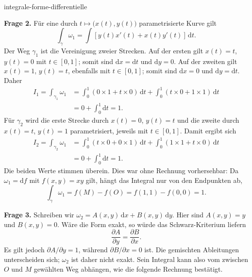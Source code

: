 \begin{exo}{integrale-forme-differentielle}
\begin{solution}
\textbf{Frage 2.} Für eine durch $t\mapsto\bigl(x(t),y(t)\bigr)$
parametrisierte Kurve gilt
\[
\int_\gamma\omega_1=\int\left[y(t)x'(t)+x(t)y'(t)\right]\,\mathrm{d}t.
\]
Der Weg $\gamma_1$ ist die Vereinigung zweier Strecken. Auf der ersten gilt
$x(t)=t$, $y(t)=0$ mit $t\in[0,1]$; somit sind $\mathrm{d}x=\mathrm{d}t$
und $\mathrm{d}y=0$. Auf der zweiten gilt $x(t)=1$, $y(t)=t$, ebenfalls mit
$t\in[0,1]$; somit sind $\mathrm{d}x=0$ und $\mathrm{d}y=\mathrm{d}t$. Daher
\[
\begin{aligned}
I_1=\int_{\gamma_1}\omega_1
&=\int_0^1\left(0\times1+t\times0\right)\,\mathrm{d}t
+\int_0^1\left(t\times0+1\times1\right)\,\mathrm{d}t\\
&=0+\int_0^1\mathrm{d}t=1.
\end{aligned}
\]
Für $\gamma_2$ wird die erste Strecke durch $x(t)=0$, $y(t)=t$ und die
zweite durch $x(t)=t$, $y(t)=1$ parametrisiert, jeweils mit $t\in[0,1]$.
Damit ergibt sich
\[
\begin{aligned}
I_2=\int_{\gamma_2}\omega_1
&=\int_0^1\left(t\times0+0\times1\right)\,\mathrm{d}t
+\int_0^1\left(1\times1+t\times0\right)\,\mathrm{d}t\\
&=0+\int_0^1\mathrm{d}t=1.
\end{aligned}
\]
Die beiden Werte stimmen überein. Dies war ohne Rechnung vorhersehbar: Da
$\omega_1=\mathrm{d}f$ mit $f(x,y)=xy$ gilt, hängt das Integral nur von den
Endpunkten ab,
\[
\int_\gamma\omega_1=f(M)-f(O)=f(1,1)-f(0,0)=1.
\]

\textbf{Frage 3.} Schreiben wir
$\omega_2=A(x,y)\,\mathrm{d}x+B(x,y)\,\mathrm{d}y$. Hier sind $A(x,y)=y$
und $B(x,y)=0$. Wäre die Form exakt, so würde das Schwarz-Kriterium liefern
\[
\frac{\partial A}{\partial y}=\frac{\partial B}{\partial x}.
\]
Es gilt jedoch $\partial A/\partial y=1$, während $\partial B/\partial x=0$
ist. Die gemischten Ableitungen unterscheiden sich; $\omega_2$ ist daher
nicht exakt. Sein Integral kann also vom zwischen $O$ und $M$ gewählten Weg
abhängen, wie die folgende Rechnung bestätigt.


\end{solution}
\end{exo}
